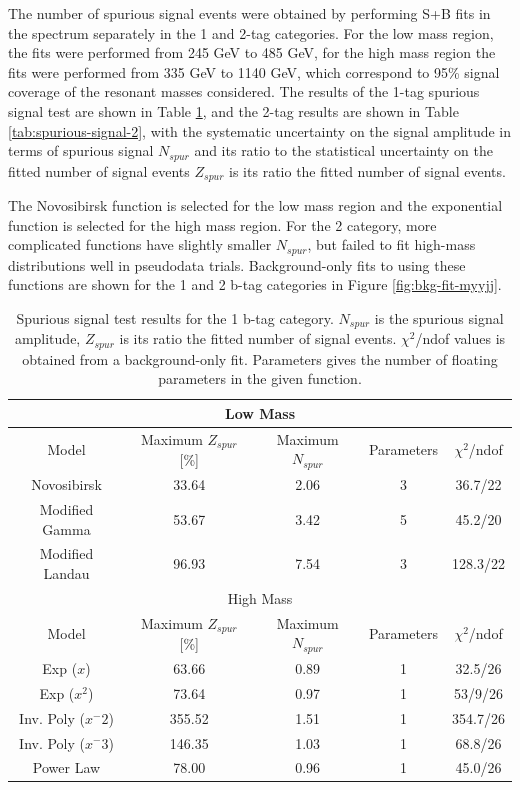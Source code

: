 The number of spurious signal events were obtained by performing S+B fits in the \myybb spectrum separately in the 1 and 2-tag categories. For the low mass region, the fits were performed from 245 GeV to 485 GeV, for the high mass region the fits were performed from 335 GeV to 1140 GeV, which correspond to 95\% signal coverage of the resonant masses considered. The results of the 1-tag spurious signal test are shown in Table \ref{tab:spurious-signal-1}, and the 2-tag results are shown in Table \ref{tab:spurious-signal-2}, with the systematic uncertainty on the signal amplitude in terms of spurious signal $N_{spur}$ and its ratio to the statistical uncertainty on the fitted number of signal events $Z_{spur}$ is its ratio the fitted number of signal events.

The Novosibirsk function is selected for the low mass region and the exponential function is selected for the high mass region. For the 2 \btag category, more complicated functions have slightly smaller $N_{spur}$, but failed to fit high-mass distributions well in pseudodata trials. Background-only fits to using these functions are shown for the 1 and 2 b-tag categories in Figure \ref{fig:bkg-fit-myyjj}.

\begin{table}[!h]
  \centering
  \caption[Spurious signal test results for the 1 b-tag category]{Spurious signal test results for the 1 b-tag category. $N_{spur}$ is the spurious signal amplitude, $Z_{spur}$ is its ratio the fitted number of signal events. $\chi^2$/ndof values is obtained from a background-only fit. Parameters gives the number of floating parameters in the given function.}
  \label{tab:spurious-signal-1}
  \begin{tabular}{|c|c|c|c|c|}
    \hline
    \multicolumn{5}{|c|}{Low Mass}\\
    \hline
    Model     &   Maximum $Z_{spur}$ [\%]      &      Maximum $N_{spur}$      &   Parameters     &    $\chi^2$/ndof \\
    \hline
    Novosibirsk        & 33.64    &   2.06  & 3  & 36.7/22 \\
    Modified Gamma     & 53.67    &   3.42  & 5  & 45.2/20 \\
    Modified Landau    & 96.93    &   7.54  & 3  & 128.3/22 \\
    \hline
    \multicolumn{5}{|c|}{High Mass}\\
    \hline
    Model     &   Maximum $Z_{spur}$ [\%]      &      Maximum $N_{spur}$      &   Parameters     &    $\chi^2$/ndof \\
    \hline
    Exp ($x$)             &  63.66    &  0.89  & 1  & 32.5/26 \\
    Exp ($x^2$)           &  73.64    &  0.97  & 1  & 53/9/26 \\
    Inv. Poly ($x^-2$)    &  355.52   &  1.51  & 1  & 354.7/26 \\
    Inv. Poly ($x^-3$)    &  146.35   &  1.03  & 1  & 68.8/26 \\
    Power Law             &  78.00    &  0.96  & 1  & 45.0/26 \\
    \hline    
  \end{tabular}
\end{table}

